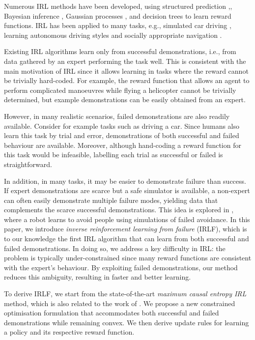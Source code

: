 \documentclass{aamas2016}
\begin{document}
Numerous IRL methods have been developed, using structured prediction \cite{ratliff2006maximum},\cite{klein2012inverse}, Bayesian inference \cite{ramachandran2007bayesian}, Gaussian processes \cite{levine2011nonlinear}, and decision trees \cite{ratliff2007boosting} to learn reward functions. IRL has been applied to many tasks, e.g., simulated car driving \cite{abbeel2004apprenticeship}, learning autonomous driving styles \cite{kuderer2015learning} and socially appropriate navigation \cite{henry2010learning,vasquez2014inverse}. 

Existing IRL algorithms learn only from successful demonstrations, i.e., from data gathered by an expert performing the task well. This is consistent with the main motivation of IRL since it allows learning in tasks where the reward cannot be trivially hard-coded.  For example, the reward function that allows an agent to perform complicated manoeuvres while flying a helicopter cannot be trivially determined, but example demonstrations can be easily obtained from an expert.

However, in many realistic scenarios, failed demonstrations are also readily available.  Consider for example tasks such as driving a car.  Since humans also learn this task by trial and error, demonstrations of both successful and failed behaviour are available. Moreover, although hand-coding a reward function for this task would be infeasible, labelling each trial as successful or failed is straightforward.

In addition, in many tasks, it may be easier to demonstrate failure than success.  If expert demonstrations are scarce but a safe simulator is available, a non-expert can often easily demonstrate multiple failure modes, yielding data that complements the scarce successful demonstrations. This idea is explored in \cite{choi2015}, where a robot learns to avoid people using simulations of failed avoidance.
In this paper, we introduce \emph{inverse reinforcement learning from failure} (IRLF), which is to our knowledge the first IRL algorithm that can learn from both successful and failed demonstrations. In doing so, we address a key difficulty in IRL: the problem is typically under-constrained since many reward functions are consistent with the expert's behaviour.  By exploiting failed demonstrations, our method reduces this ambiguity, resulting in faster and better learning.

To derive IRLF, we start from the state-of-the-art \emph{maximum causal entropy IRL} \cite{ziebart2008maximum,ziebart2010modelingthesis} method, which is also related to the work of \cite{babes2011apprenticeship}. We propose a new constrained optimisation formulation that accommodates both successful and failed demonstrations while remaining convex.  We then derive update rules for learning a policy and its respective reward function.
\end{document}
